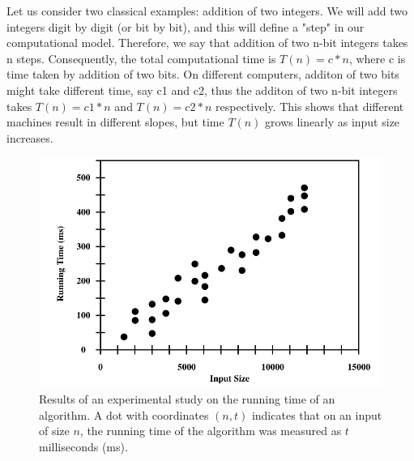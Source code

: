 \documentclass[a4paper,12pt]{report}
\begin{document}
Let us consider two classical examples: addition of two integers. We will add
two integers digit by digit (or bit by bit), and this will define a "step" in
our computational model. Therefore, we say that addition of two n-bit integers
takes n steps. Consequently, the total computational time is $T(n) = c * n$,
where c is time taken by addition of two bits. On different computers, additon
of two bits might take different time, say c1 and c2, thus the additon of two
n-bit integers takes $T(n) = c1 * n$ and $T(n) = c2 * n$ respectively. This
shows that different machines result in different slopes, but time $T(n)$ grows linearly as input size increases.
\begin{figure}[h]
	\begin{center}
	\includegraphics[scale=0.5]{"fig1.png"}
	\end{center}
	\caption{\textsf{Results of an experimental study on the running time of an algorithm.
	A dot with coordinates $(n,t)$ indicates that on an input of size $n$, the running time
	of the algorithm was measured as $t$ milliseconds (ms).}}
\end{figure}
\end{document}

